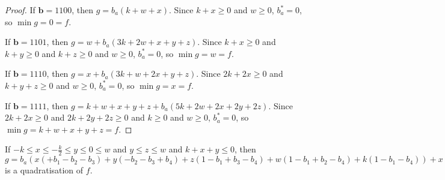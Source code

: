 \documentclass[11pt]{scrartcl}
\newcommand{\vc}[1]{\boldsymbol{#1}}
\begin{document}
\begin{proof}
If $\vc b = 1100$, then $g = b_a(k + w + x)$.
Since $k + x \ge 0$ and $w \ge 0$, $b_a^* = 0$, so $\min g = 0 = f$.

If $\vc b = 1101$, then $g = w + b_a(3k + 2w + x + y + z)$.
Since $k + x \ge 0 $ and $k + y \ge 0 $ and $k + z \ge 0 $ and $w  \ge 0$, $b_a^* = 0$, so $\min g = w = f$.

If $\vc b = 1110$, then $g = x + b_a(3k + w + 2x + y + z)$.
Since $2k + 2x \ge 0$ and $k + y + z \ge 0$ and $w \ge 0$, $b_a^* = 0$, so $\min g = x = f$.

If $\vc b = 1111$, then $g = k + w + x + y + z + b_a(5k + 2w + 2x + 2y + 2z)$.
Since $2k + 2x \ge 0$ and $2k + 2y + 2z\ge 0$ and $k \ge 0$ and $w  \ge 0$, $b_a^* = 0$, so $\min g = k + w + x + y + z = f$.

\end{proof}

\begin{lemma}
	\label{case4}
	If $-k\le x \le -\frac{k}{2} \le y \le 0 \le w$ and $y \le z \le w$ and $k+x+y \le 0$, then $g = b_a(x(+b_1-b_2-b_3)+y(-b_2-b_3+b_4)+z(1-b_1+b_3-b_4)+w(1-b_1+b_2-b_4)+k(1-b_1-b_4))+x(-b_1+b_1b_2+b_1b_3)+y(-b_4+b_2b_4+b_3b_4)+z(+b_1b_4)+w(+b_1b_4)+k(+b_1b_4)$ is a quadratisation of $f$.
 \end{lemma}
\end{document}
